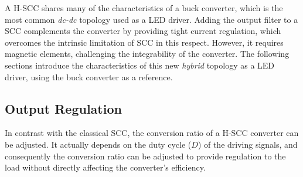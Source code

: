 A H-SCC shares many of the characteristics of a buck converter, which is the most common \emph{dc-dc} topology used as a LED driver. Adding the output filter to a SCC complements the converter by providing tight current regulation, which overcomes the intrinsic limitation of SCC in this respect. However, it requires magnetic elements, challenging the integrability  of the converter. The following sections introduce the characteristics of this new \emph{hybrid} topology as a LED driver, using the buck converter as a reference. %

\subsection{Output Regulation}
\label{sec:out_reg}
In contrast with the classical SCC, the conversion ratio of a H-SCC converter can be adjusted. It actually depends on the duty cycle ($D$) of the driving signals, and consequently the conversion ratio can be adjusted to provide regulation to the load without directly affecting the converter's efficiency.

